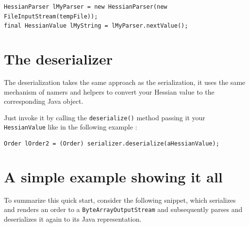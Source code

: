 \documentclass[a4paper]{article}
\begin{document}
\medskip
\begin{lstlisting}
HessianParser lMyParser = new HessianParser(new FileInputStream(tempFile));
final HessianValue lMyString = lMyParser.nextValue();
\end{lstlisting}
\medskip

\section{The deserializer}

The deserialization takes the same approach as the serialization, it uses the same mechanism of namers and helpers to convert your Hessian value to the corresponding Java object.

Just invoke it by calling the \lstinline$deserialize()$ method passing it your \lstinline$HessianValue$ like in the following example :

\medskip
\begin{lstlisting}
Order lOrder2 = (Order) serializer.deserialize(aHessianValue);
\end{lstlisting}
\medskip

\section{A simple example showing it all}

To summarize this quick start, consider the following snippet, which serializes and renders an order to a \lstinline$ByteArrayOutputStream$ and subsequently parses and deserializes it again to its Java representation.
\end{document}
